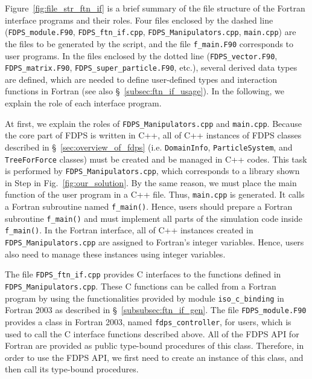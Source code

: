 \documentclass[twocolumn,useamsfonts]{pasj01}
\begin{document}
Figure~\ref{fig:file_str_ftn_if} is a brief summary of the file structure of the Fortran interface programs and their roles. Four files enclosed by the dashed line (\texttt{FDPS\_module.F90}, \texttt{FDPS\_ftn\_if.cpp}, \texttt{FDPS\_Manipulators.cpp}, \texttt{main.cpp}) are the files to be generated by the script, and the file \texttt{f\_main.F90} corresponds to user programs. In the files enclosed by the dotted line (\texttt{FDPS\_vector.F90}, \texttt{FDPS\_matrix.F90}, \texttt{FDPS\_super\_particle.F90}, etc.), several derived data types are defined, which are needed to define user-defined types and interaction functions in Fortran (see also \S~\ref{subsec:ftn_if_usage}). In the following, we explain the role of each interface program.

At first, we explain the roles of \texttt{FDPS\_Manipulators.cpp} and \texttt{main.cpp}. Because the core part of FDPS is written in C++, all of C++ instances of FDPS classes described in \S~\ref{sec:overview_of_fdps} (i.e. \texttt{DomainInfo}, \texttt{ParticleSystem}, and \texttt{TreeForForce} classes) must be created and be managed in C++ codes. This task is performed by \texttt{FDPS\_Manipulators.cpp}, which corresponds to a library shown in Step {\large {}\hbox{}} in Fig.~\ref{fig:our_solution}. By the same reason, we must place the main function of the user program in a C++ file. Thus, \texttt{main.cpp} is generated. It calls a Fortran subroutine named \texttt{f\_main()}. Hence, users should prepare a Fortran subroutine \texttt{f\_main()} and must implement all parts of the simulation code inside \texttt{f\_main()}. In the Fortran interface, all of C++ instances created in \texttt{FDPS\_Manipulators.cpp} are assigned to Fortran’s integer variables. Hence, users also need to manage these instances using integer variables.

The file \texttt{FDPS\_ftn\_if.cpp} provides C interfaces to the functions defined in \texttt{FDPS\_Manipulators.cpp}. These C functions can be called from a Fortran program by using the functionalities provided by module \texttt{iso\_c\_binding} in Fortran 2003 as described in \S~\ref{subsubsec:ftn_if_gen}. The file \texttt{FDPS\_module.F90} provides a class in Fortran 2003, named \texttt{fdps\_controller}, for users, which is used to call the C interface functions described above. All of the FDPS API for Fortran are provided as public type-bound procedures of this class. Therefore, in order to use the FDPS API, we first need to create an instance of this class, and then call its type-bound procedures.
\end{document}
